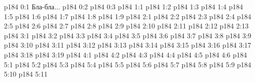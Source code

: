 \author{Промежуточные создания}
\vs p184 0:1  Бла-бла...
\vs p184 0:2 
\vs p184 0:3 
\vs p184 1:1 
\vs p184 1:2 
\vs p184 1:3 
\vs p184 1:4 
\vs p184 1:5 
\vs p184 1:6 
\vs p184 1:7 
\vs p184 1:8 
\vs p184 1:9 
\vs p184 2:1 
\vs p184 2:2 
\vs p184 2:3 
\vs p184 2:4 
\vs p184 2:5 
\vs p184 2:6 
\vs p184 2:7 
\vs p184 2:8 
\vs p184 2:9 
\vs p184 2:10 \pc 
\vs p184 2:11 \pc 
\vs p184 2:12 
\vs p184 2:13 
\vs p184 3:1 
\vs p184 3:2 
\vs p184 3:3 
\vs p184 3:4 
\vs p184 3:5 \pc 
\vs p184 3:6 \pc 
\vs p184 3:7 
\vs p184 3:8 
\vs p184 3:9 
\vs p184 3:10 
\vs p184 3:11 
\vs p184 3:12 
\vs p184 3:13 \pc 
\vs p184 3:14 
\vs p184 3:15 
\vs p184 3:16 
\vs p184 3:17 
\vs p184 3:18 
\vs p184 3:19 \pc 
{}
\vs p184 4:1 
\vs p184 4:2 
\vs p184 4:3 
\vs p184 4:4 \pc 
\vs p184 4:5 
\vs p184 4:6 
\vs p184 5:1 
\vs p184 5:2 
\vs p184 5:3 
\vs p184 5:4 
\vs p184 5:5 
\vs p184 5:6 \pc 
\vs p184 5:7 
\vs p184 5:8 
\vs p184 5:9 
\vs p184 5:10 \pc 
\vs p184 5:11 
\quizlink
